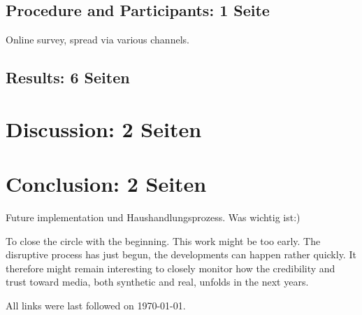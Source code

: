 \documentclass[
  a4paper,  %
  twoside,  %
  bibliography=totoc,
  headsepline,
  cleardoublepage=empty,
  parskip=half,
  draft=false
]{scrbook}
\begin{document}
\section{Procedure and Participants: 1 Seite}
Online survey, spread via various channels.

\section{Results: 6 Seiten}

\chapter{Discussion: 2 Seiten}

\chapter{Conclusion: 2 Seiten}
\label{sec:conclusion}

Future implementation und Haushandlungsprozess. Was wichtig ist:) 

To close the circle with the beginning. This work might be too early. The disruptive process has just begun, the developments can happen rather quickly. It therefore might remain interesting to closely monitor how the credibility and trust toward media, both synthetic and real, unfolds in the next years. 






\printbibliography

All links were last followed on \today{}.

\appendix
%

\pagestyle{empty}
\renewcommand*{\chapterpagestyle}{empty}
\Affirmation
\end{document}
